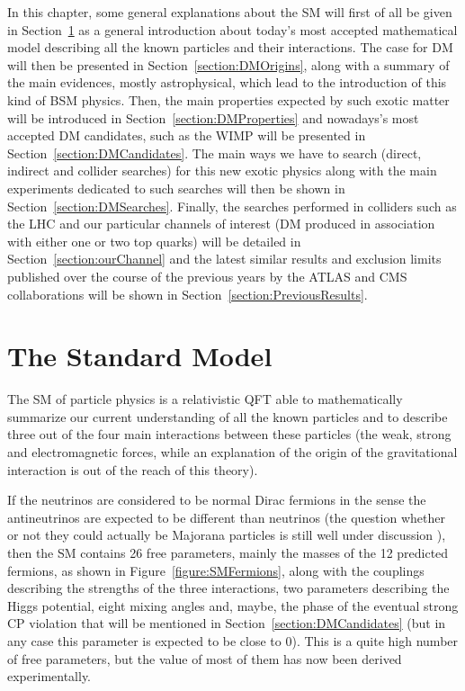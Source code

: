 \documentclass[a4paper, 10pt, openright]{report}
\begin{document}
In this chapter, some general explanations about the \ac{SM} will first of all be given in Section~\ref{section:SM} as a general introduction about today's most accepted mathematical model describing all the known particles and their interactions. The case for \ac{DM} will then be presented in Section~\ref{section:DMOrigins}, along with a summary of the main evidences, mostly astrophysical, which lead to the introduction of this kind of \acf{BSM} physics. Then, the main properties expected by such exotic matter will be introduced in Section~\ref{section:DMProperties} and nowadays's most accepted \ac{DM} candidates, such as the \acf{WIMP} will be presented in Section~\ref{section:DMCandidates}. The main ways we have to search (direct, indirect and collider searches) for this new exotic physics along with the main experiments dedicated to such searches will then be shown in Section~\ref{section:DMSearches}. Finally, the searches performed in colliders such as the \ac{LHC} and our particular channels of interest (\ac{DM} produced in association with either one or two top quarks) will be detailed in Section~\ref{section:ourChannel} and the latest similar results and exclusion limits published over the course of the previous years by the \ac{ATLAS} and \ac{CMS} collaborations will be shown in Section~\ref{section:PreviousResults}.

\section{The Standard Model} \label{section:SM}

The \ac{SM} of particle physics is a relativistic \ac{QFT} able to  mathematically summarize our current understanding of all the known particles and to describe three out of the four main interactions between these particles (the weak, strong and electromagnetic forces, while an explanation of the origin of the gravitational interaction is out of the reach of this theory). 

If the neutrinos are considered to be normal Dirac fermions in the sense the antineutrinos are expected to be different than neutrinos (the question whether or not they could actually be Majorana particles is still well under discussion \cite{Majorana}), then the \ac{SM} contains 26 free parameters, mainly the masses of the 12 predicted fermions, as shown in Figure~\ref{figure:SMFermions}, along with the couplings describing the strengths of the three interactions, two parameters describing the Higgs potential, eight mixing angles and, maybe, the phase of the eventual strong CP violation that will be mentioned in Section~\ref{section:DMCandidates} (but in any case this parameter is expected to be close to 0). This is a quite high number of free parameters, but the value of most of them has now been derived experimentally.
\end{document}
